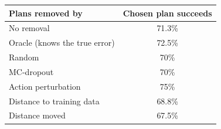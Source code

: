 \begin{tabular}{@{}lc@{}}
\toprule
Plans removed by & Chosen plan succeeds \\
\midrule
No removal & 71.3\% \\
Oracle (knows the true error) & 72.5\% \\
Random & 70\% \\
MC-dropout & 70\% \\
Action perturbation & 75\% \\
Distance to training data & 68.8\% \\
Distance moved & 67.5\% \\
\bottomrule
\end{tabular}
